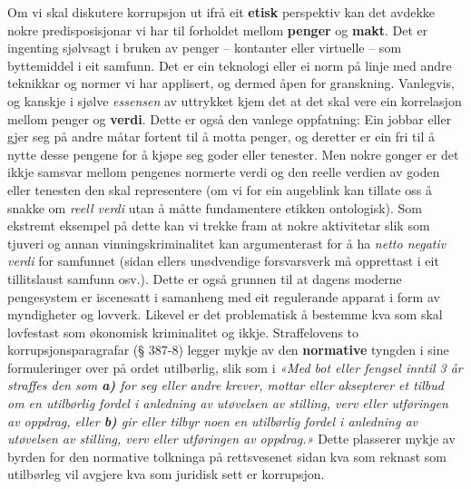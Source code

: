 \documentclass[12pt,a4paper]{article}
\begin{document}
Om vi skal diskutere korrupsjon ut ifrå eit \textbf{etisk} perspektiv kan det avdekke nokre predisposisjonar vi har til forholdet mellom \textbf{penger} og \textbf{makt}. Det er ingenting sjølvsagt i bruken av penger -- kontanter eller virtuelle – som byttemiddel i eit samfunn. Det er ein teknologi eller ei norm på linje med andre teknikkar og normer vi har applisert, og dermed åpen for granskning. Vanlegvis, og kanskje i sjølve \textit{essensen} av uttrykket kjem det at det skal vere ein korrelasjon mellom penger og \textbf{verdi}. Dette er også den vanlege oppfatning: Ein jobbar eller gjer seg på andre måtar fortent til å motta penger, og deretter er ein fri til å nytte desse pengene for å kjøpe seg goder eller tenester. Men nokre gonger er det ikkje samsvar mellom pengenes normerte verdi og den reelle verdien av goden eller tenesten den skal representere (om vi for ein augeblink kan tillate oss å snakke om \textit{reell verdi} utan å måtte fundamentere etikken ontologisk). Som ekstremt eksempel på dette kan vi trekke fram at nokre aktivitetar slik som tjuveri og annan vinningskriminalitet kan argumenterast for å ha \textit{netto negativ verdi} for samfunnet (sidan ellers unødvendige forsvarsverk må opprettast i eit tillitslaust samfunn osv.). Dette er også grunnen til at dagens moderne pengesystem er iscenesatt i samanheng med eit regulerande apparat i form av myndigheter og lovverk. Likevel er det problematisk å bestemme kva som skal lovfestast som økonomisk kriminalitet og ikkje. Straffelovens to korrupsjonsparagrafar (§ 387-8) legger mykje av den \textbf{normative} tyngden i sine formuleringer over på ordet utilbørlig, slik som i 
	\textit{«Med bot eller fengsel inntil 3 år straffes den som \textbf{a)} for seg eller andre krever, mottar eller aksepterer et tilbud om en utilbørlig fordel i anledning av utøvelsen av stilling, verv eller utføringen av oppdrag, eller \textbf{b)} gir eller tilbyr noen en utilbørlig fordel i anledning av utøvelsen av stilling, verv eller utføringen av oppdrag.»} \cite{straffelov}
Dette plasserer mykje av byrden for den normative tolkninga på rettsvesenet sidan kva som reknast som utilbørleg vil avgjere kva som  juridisk sett er korrupsjon.
\end{document}
